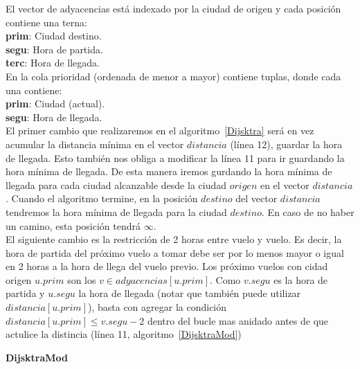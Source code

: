 El vector de adyacencias está indexado por la ciudad de origen y cada posición contiene una terna:\\
\textbf{prim}: Ciudad destino.\\
\textbf{segu}: Hora de partida.\\
\textbf{terc}: Hora de llegada.\\

En la cola prioridad (ordenada de menor a mayor) contiene tuplas, donde cada una contiene:\\
\textbf{prim}: Ciudad (actual).\\
\textbf{segu}: Hora de llegada.\\

El primer cambio que realizaremos en el algoritmo~\ref{Dijsktra} será en vez acumular la distancia mínima en el vector $distancia$ (línea 12), 
guardar la hora de llegada. Esto también nos obliga a modificar la línea 11 para ir guardando la hora mínima de llegada. De esta manera iremos
gurdando la hora mínima de llegada para cada ciudad alcanzable desde la ciudad $origen$ en el vector $distancia$. Cuando el algoritmo termine,
en la posición $destino$ del vector $distancia$ tendremos la hora mínima de llegada para la ciudad $destino$. En caso de no haber un camino, esta
posición tendrá $\infty$. \\

El siguiente cambio es la restricción de 2 horas entre vuelo y vuelo. Es decir, la hora de partida del próximo vuelo a tomar debe ser por lo menos
mayor o igual en 2 horas a la hora de llega del vuelo previo. Los próximo vuelos con cidad origen $u.prim$ son los $v \in adyacencias[u.prim]$. 
Como $v.segu$ es la hora de partida y $u.segu$ la hora de llegada (notar que también puede utilizar $distancia[u.prim]$), basta con agregar
la condición $distancia[u.prim] \le v.segu - 2$ dentro del bucle mas anidado antes de que actulice la distincia (línea 11, algoritmo~\ref{DijsktraMod})

\LinesNumbered
\begin{algorithm}[H]
\DontPrintSemicolon
{}
\caption{\textbf{DijsktraMod} \label{DijsktraMod}}
\end{algorithm}

